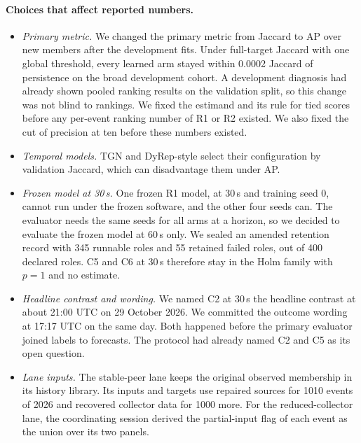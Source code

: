 \paragraph{Choices that affect reported numbers.}
\begin{itemize}
\item \emph{Primary metric.} We changed the primary metric from Jaccard to AP over new members after the development fits.
Under full-target Jaccard with one global threshold, every learned arm stayed within 0.0002 Jaccard of persistence on the broad development cohort.
A development diagnosis had already shown pooled ranking results on the validation split, so this change was not blind to rankings.
We fixed the estimand and its rule for tied scores before any per-event ranking number of R1 or R2 existed.
We also fixed the cut of precision at ten before these numbers existed.
\item \emph{Temporal models.} TGN and DyRep-style select their configuration by validation Jaccard, which can disadvantage them under AP.
\item \emph{Frozen model at 30\,s.} One frozen R1 model, at 30\,s and training seed 0, cannot run under the frozen software, and the other four seeds can.
The evaluator needs the same seeds for all arms at a horizon, so we decided to evaluate the frozen model at 60\,s only.
We sealed an amended retention record with 345 runnable roles and 55 retained failed roles, out of 400 declared roles.
C5 and C6 at 30\,s therefore stay in the Holm family with $p=1$ and no estimate.
\item \emph{Headline contrast and wording.} We named C2 at 30\,s the headline contrast at about 21:00 UTC on 29 October 2026.
We committed the outcome wording at 17:17 UTC on the same day.
Both happened before the primary evaluator joined labels to forecasts.
The protocol had already named C2 and C5 as its open question.
\item \emph{Lane inputs.} The stable-peer lane keeps the original observed membership in its history library.
Its inputs and targets use repaired sources for \num{1010} events of 2026 and recovered collector data for \num{1000} more.
For the reduced-collector lane, the coordinating session derived the partial-input flag of each event as the union over its two panels.
\end{itemize}

